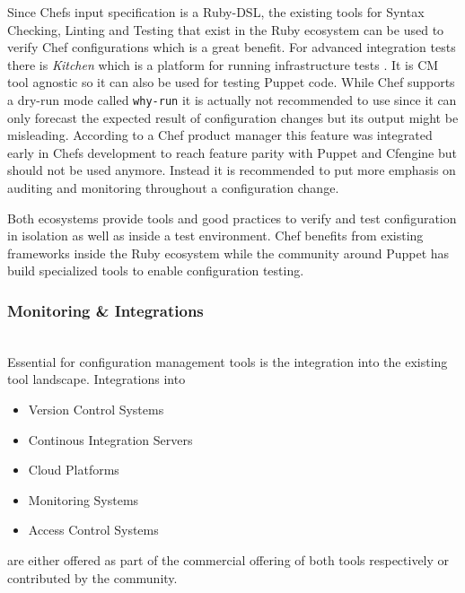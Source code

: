 Since Chefs input specification is a Ruby-DSL, the existing tools for Syntax Checking, Linting and Testing that exist in the Ruby ecosystem can be used to verify Chef configurations which is a great benefit. For advanced integration tests there is \textit{Kitchen} which is a platform for running infrastructure tests \cite{kitchen}. It is CM tool agnostic so it can also be used for testing Puppet code. While Chef supports a dry-run mode called \texttt{why-run} it is actually not recommended to use since it can only forecast the expected result of configuration changes but its output might be misleading. According to a Chef product manager this feature was integrated early in Chefs development to reach feature parity with Puppet and Cfengine but should not be used anymore. Instead it is recommended to put more emphasis on auditing and monitoring throughout a configuration change\cite{whyrun}.

Both ecosystems provide tools and good practices to verify and test configuration in isolation as well as inside a test environment. Chef benefits from existing frameworks inside the Ruby ecosystem while the community around Puppet has build specialized tools to enable configuration testing.


\subsubsection{Monitoring \& Integrations}\hfill\\

Essential for configuration management tools is the integration into the existing tool landscape. Integrations into 

\begin{itemize}
\item Version Control Systems
\item Continous Integration Servers
\item Cloud Platforms
\item Monitoring Systems
\item Access Control Systems
\end{itemize}

are either offered as part of the commercial offering of both tools respectively or contributed by the community.

